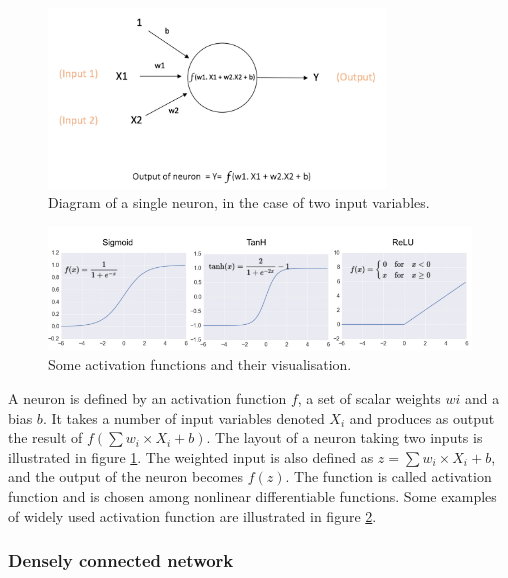 \begin{figure}
    \centering
    \includegraphics[width=0.8\textwidth]{Images/neuron_diagram}
    \caption{Diagram of a single neuron, in the case of two input variables.}
    \label{fig:neuron_diagram}
\end{figure}


\begin{figure}
    \centering
    \includegraphics[width=\textwidth]{Images/activation_functions.png}
    \caption{Some activation functions and their visualisation.}
    \label{fig:activation_functions}
\end{figure}

A neuron is defined by an activation function $f$, a set of scalar weights $wi$ and a bias $b$. It takes a number of input variables denoted $X_i$ and produces as output the result of $f(\sum w_i\times X_i + b)$. The layout of a neuron taking two inputs is illustrated in figure \ref{fig:neuron_diagram}. The weighted input is also defined as $z = \sum w_i\times X_i + b$, and the output of the neuron becomes $f(z)$. The function is called activation function and is chosen among nonlinear differentiable functions. Some examples of widely used activation function are illustrated in figure \ref{fig:activation_functions}.

\subsubsection{Densely connected network}


